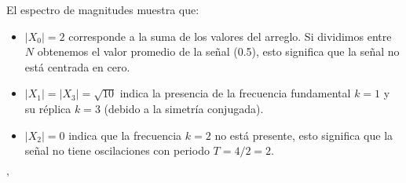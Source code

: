 \begin{enumerate}[a)]
\begin{center}
	      \end{center}

	      El espectro de magnitudes muestra que:
	      \begin{itemize}
		      \item $|X_0| = 2$ corresponde a la suma de los valores del arreglo. Si dividimos entre $N$ obtenemos el valor promedio de la señal (0.5), esto significa que la señal no está centrada en cero.
		      \item $|X_1| = |X_3| = \sqrt{10}$ indica la presencia de la frecuencia fundamental $k = 1$ y su réplica $k = 3$ (debido a la simetría conjugada).
		      \item $|X_2| = 0$ indica que la frecuencia $k = 2$ no está presente, esto significa que la señal no tiene oscilaciones con periodo $T = 4/2 = 2$.
	      \end{itemize}

\end{enumerate}
'